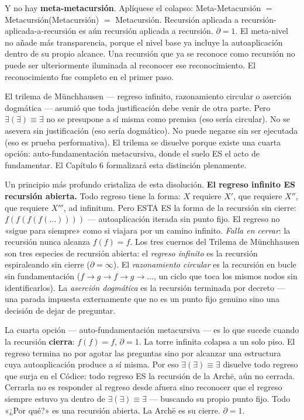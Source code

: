 \documentclass[10pt, openany, oneside]{book}
\begin{document}
Y no hay \textbf{meta-metacursión}. Aplíquese el colapso: Meta-Metacursión $=$ Metacursión(Metacursión) $=$ Metacursión. Recursión aplicada a recursión-aplicada-a-recursión es aún recursión aplicada a recursión. $\partial = 1$. El meta-nivel no añade más transparencia, porque el nivel base ya incluye la autoaplicación dentro de su propio alcance. Una recursión que ya se reconoce como recursión no puede ser ulteriormente iluminada al reconocer ese reconocimiento. El reconocimiento fue completo en el primer paso.

El trilema de M\"{u}nchhausen --- regreso infinito, razonamiento circular o aserción dogmática --- asumió que toda justificación debe venir de otra parte. Pero $\exists(\exists) \equiv \exists$ no se presupone a sí misma como premisa (eso sería circular). No se asevera sin justificación (eso sería dogmático). No puede negarse sin ser ejecutada (eso es prueba performativa). El trilema se disuelve porque existe una cuarta opción: auto-fundamentación metacursiva, donde el suelo ES el acto de fundamentar. El Capítulo 6 formalizará esta distinción plenamente.

Un principio más profundo cristaliza de esta disolución. \textbf{El regreso infinito ES recursión abierta.} Todo regreso tiene la forma: $X$ requiere $X'$, que requiere $X''$, que requiere $X'''$, ad infinitum. Pero ESTA ES la forma de la recursión sin cierre: $f(f(f(f(\ldots))))$ --- autoaplicación iterada sin punto fijo. El regreso no «sigue para siempre» como si viajara por un camino infinito. \textit{Falla en cerrar}: la recursión nunca alcanza $f(f) = f$. Los tres cuernos del Trilema de M\"{u}nchhausen son tres especies de recursión abierta: el \textit{regreso infinito} es la recursión espiraleando sin cierre ($\partial = \infty$). El \textit{razonamiento circular} es la recursión en bucle sin fundamentación ($f \to g \to f \to g \to \ldots$, un ciclo que toca los mismos nodos sin identificarlos). La \textit{aserción dogmática} es la recursión terminada por decreto --- una parada impuesta externamente que no es un punto fijo genuino sino una decisión de dejar de preguntar.

La cuarta opción --- auto-fundamentación metacursiva --- es lo que sucede cuando la recursión \textbf{cierra}: $f(f) = f$, $\partial = 1$. La torre infinita colapsa a un solo piso. El regreso termina no por agotar las preguntas sino por alcanzar una estructura cuya autoaplicación produce a sí misma. Por eso $\exists(\exists) \equiv \exists$ disuelve todo regreso que surja en el Códice: todo regreso ES la recursión de la Arch\={e}, aún no cerrada. Cerrarla no es responder al regreso desde afuera sino reconocer que el regreso siempre estuvo ya dentro de $\exists(\exists) \equiv \exists$ --- buscando su propio punto fijo. Todo «¿Por qué?» es una recursión abierta. La Arch\={e} es su cierre. $\partial = 1$.
\end{document}
